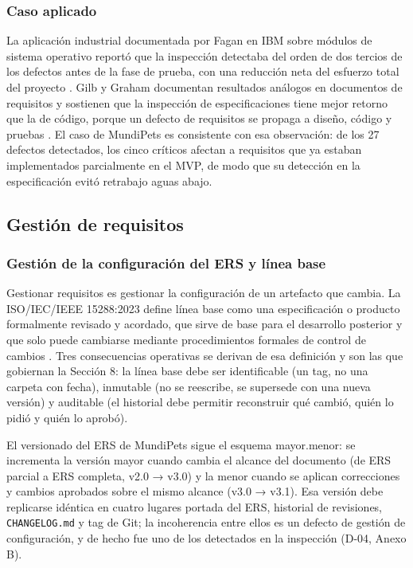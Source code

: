 \documentclass[journal,onecolumn]{IEEEtran}
\begin{document}
	\subsubsection{Caso aplicado}
	
	La aplicación industrial documentada por Fagan en IBM sobre módulos de sistema operativo reportó que la inspección detectaba del orden de dos tercios de los defectos antes de la fase de prueba, con una reducción neta del esfuerzo total del proyecto \cite{fagan}. Gilb y Graham documentan resultados análogos en documentos de requisitos y sostienen que la inspección de especificaciones tiene mejor retorno que la de código, porque un defecto de requisitos se propaga a diseño, código y pruebas \cite{gilb}. El caso de MundiPets es consistente con esa observación: de los 27 defectos detectados, los cinco críticos afectan a requisitos que ya estaban implementados parcialmente en el MVP, de modo que su detección en la especificación evitó retrabajo aguas abajo.
	
	\subsection{Gestión de requisitos}
	
	\subsubsection{Gestión de la configuración del ERS y línea base}
	
	Gestionar requisitos es gestionar la configuración de un artefacto que cambia. La ISO/IEC/IEEE 15288:2023 define línea base como una especificación o producto formalmente revisado y acordado, que sirve de base para el desarrollo posterior y que solo puede cambiarse mediante procedimientos formales de control de cambios \cite{ieee15288}. Tres consecuencias operativas se derivan de esa definición y son las que gobiernan la Sección 8: la línea base debe ser identificable (un tag, no una carpeta con fecha), inmutable (no se reescribe, se supersede con una nueva versión) y auditable (el historial debe permitir reconstruir qué cambió, quién lo pidió y quién lo aprobó).
	
	El versionado del ERS de MundiPets sigue el esquema mayor.menor: se incrementa la versión mayor cuando cambia el alcance del documento (de ERS parcial a ERS completa, v2.0 → v3.0) y la menor cuando se aplican correcciones y cambios aprobados sobre el mismo alcance (v3.0 → v3.1). Esa versión debe replicarse idéntica en cuatro lugares portada del ERS, historial de revisiones, \texttt{CHANGELOG.md} y tag de Git; la incoherencia entre ellos es un defecto de gestión de configuración, y de hecho fue uno de los detectados en la inspección (D-04, Anexo B).
	
\end{document}

